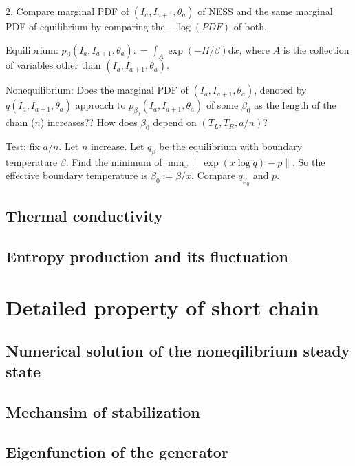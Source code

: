 \documentclass[12pt]{amsart}
\theoremstyle{definition}
\theoremstyle{remark}
\numberwithin{equation}{section}
\begin{document}
2, Compare marginal PDF of $(I_a, I_{a+1}, \theta_a)$ of NESS and the same marginal PDF of equilibrium by comparing the $-\log (PDF)$ of both. 

Equilibrium: $p_\beta(I_a, I_{a+1}, \theta_a) : = \int_A \exp(-H/\beta) \mathrm{d}x$, where $A$ is the collection of variables other than $(I_a, I_{a+1}, \theta_a)$.

Nonequilibrium: Does the marginal PDF of $(I_a, I_{a+1}, \theta_a)$, denoted by $q(I_a, I_{a+1}, \theta_a)$ approach to $p_{\beta_0}(I_a, I_{a+1}, \theta_a)$ of some $\beta_0$ as the length of the chain ($n$) increases?? How does $\beta_0$ depend on $(T_L, T_R, a/n)$? 



Test: fix $a/n$. Let $n$ increase. Let $q_\beta$ be the equilibrium with boundary temperature $\beta$. Find the minimum of $\min_x\|\exp(x\log q) - p\|$. So the effective boundary temperature is $\beta_0:= \beta/x$. Compare $q_{\beta_0}$ and $p$.



\subsection{Thermal conductivity}


\subsection{Entropy production and its fluctuation}




\section{Detailed property of short chain}
\subsection{Numerical solution of the noneqilibrium steady state}

\subsection{Mechansim of stabilization}

\subsection{Eigenfunction of the generator}
\end{document}
